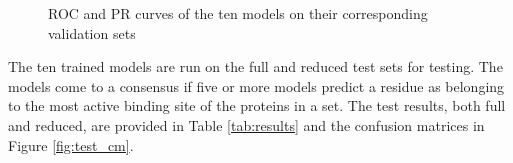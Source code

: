 \documentclass[journal=jcisd8,manuscript=article]{achemso}
\begin{document}
\begin{figure}%
    \centering
    \vspace{1em}
    \caption{\centering ROC and PR curves of the ten models on their corresponding validation sets }%
    \label{fig:valid_roc_prc}%
\end{figure}

The ten trained models are run on the full and reduced test sets for testing. The models come to a consensus if five or more models predict a residue as belonging to the most active binding site of the proteins in a set. The test results, both full and reduced, are provided in Table \ref{tab:results} and the confusion matrices in Figure \ref{fig:test_cm}.
\end{document}
